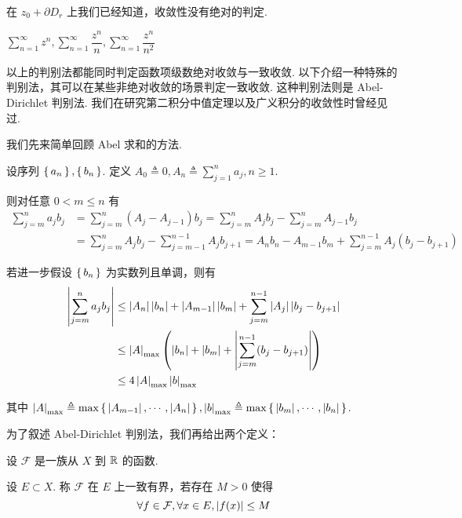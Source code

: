 \begin{hint}
    在 $z_0+\partial D_r$ 上我们已经知道，收敛性没有绝对的判定.
\end{hint}

\begin{example}
    $\sum\limits_{n=1}^\infty z^n,\sum\limits_{n=1}^\infty\dfrac{z^n}{n},\sum\limits_{n=1}^\infty\dfrac{z^n}{n^2}$
\end{example}


以上的判别法都能同时判定函数项级数绝对收敛与一致收敛. 以下介绍一种特殊的判别法，其可以在某些非绝对收敛的场景判定一致收敛. 这种判别法则是 Abel-Dirichlet 判别法. 我们在研究第二积分中值定理以及广义积分的收敛性时曾经见过.

我们先来简单回顾 Abel 求和的方法.

设序列 $\set{a_n},\set{b_n}$. 定义 $A_0\triangleq 0,A_n\triangleq\sum\limits_{j=1}^na_j,n\ge 1$.

则对任意 $0<m\le n$ 有
$$
\begin{aligned}
    \sum_{j=m}^na_jb_j&=\sum_{j=m}^n(A_j-A_{j-1})b_j=\sum_{j=m}^nA_jb_j-\sum_{j=m}^nA_{j-1}b_j\\
    &=\sum_{j=m}^nA_jb_j-\sum_{j=m-1}^{n-1}A_jb_{j+1}=A_nb_n-A_{m-1}b_m+\sum_{j=m}^{n-1}A_j(b_j-b_{j+1})
\end{aligned}
$$

若进一步假设 $\set{b_n}$ 为实数列且单调，则有
$$
\begin{aligned}
    \left\lvert{\sum_{j=m}^na_jb_j}\right\rvert&\le\left\lvert{A_n}\right\rvert\left\lvert{b_n}\right\rvert+\left\lvert{A_{m-1}}\right\rvert\left\lvert{b_m}\right\rvert+\sum_{j=m}^{n-1}\left\lvert{A_j}\right\rvert\left\lvert{b_j-b_{j+1}}\right\rvert\\
    &\le\left\lvert{A}\right\rvert_\textrm{max}\left(\left\lvert{b_n}\right\rvert+\left\lvert{b_m}\right\rvert+\left\lvert{\sum_{j=m}^{n-1}(b_j-b_{j+1})}\right\rvert\right)\\
    &\le 4\left\lvert{A}\right\rvert_\textrm{max}\left\lvert{b}\right\rvert_\textrm{max}
\end{aligned}
$$

其中 $\left\lvert{A}\right\rvert_\textrm{max}\triangleq\max\set{\left\lvert{A_{m-1}}\right\rvert,\cdots,\left\lvert{A_n}\right\rvert},\left\lvert{b}\right\rvert_\textrm{max}\triangleq\max\set{\left\lvert{b_m}\right\rvert,\cdots,\left\lvert{b_n}\right\rvert}$.

为了叙述 Abel-Dirichlet 判别法，我们再给出两个定义：

\begin{definition}
    设 $\mathcal{F}$ 是一族从 $X$ 到 $\mathbb{R}$ 的函数.
    
    设 $E\subset X$. 称 $\mathcal{F}$ 在 $E$ 上一致有界，若存在 $M>0$ 使得
$$
\forall f\in\mathcal{F},\forall x\in E,\left\lvert{f(x)}\right\rvert\le M
$$
\end{definition}

